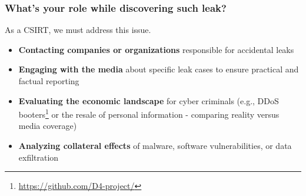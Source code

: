 \documentclass[10pt,aspectratio=169, colorlinks=true, linkcolor=circlBlue]{beamer}
\begin{document}
\begin{frame}
    \frametitle{What's your role while discovering such leak?}
    \begin{center}
        \large{As a CSIRT, we must address this issue.}
    \end{center}
    \vspace{0.5cm}

    \begin{itemize}
        \item \textbf{Contacting companies or organizations} responsible for accidental leaks
        \item \textbf{Engaging with the media} about specific leak cases to ensure practical and factual reporting
        \item \textbf{Evaluating the economic landscape} for cyber criminals (e.g., DDoS booters\footnote{\url{https://github.com/D4-project/}} or the resale of personal information - comparing reality versus media coverage)
        \item \textbf{Analyzing collateral effects} of malware, software vulnerabilities, or data exfiltration
    \end{itemize}

\end{frame}
\end{document}
